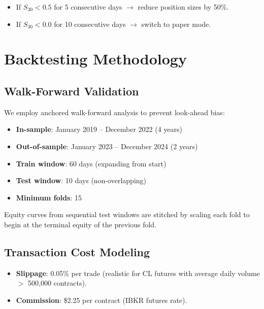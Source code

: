 \documentclass[12pt,a4paper]{article}
\begin{document}
\begin{itemize}[leftmargin=*]
    \item If $S_{30} < 0.5$ for 5 consecutive days $\rightarrow$ reduce position sizes by 50\%.
    \item If $S_{30} < 0.0$ for 10 consecutive days $\rightarrow$ switch to paper mode.
\end{itemize}

\section{Backtesting Methodology}
\label{sec:backtest}

\subsection{Walk-Forward Validation}

We employ anchored walk-forward analysis to prevent look-ahead bias:

\begin{itemize}[leftmargin=*]
    \item \textbf{In-sample}: January 2019 -- December 2022 (4 years)
    \item \textbf{Out-of-sample}: January 2023 -- December 2024 (2 years)
    \item \textbf{Train window}: 60 days (expanding from start)
    \item \textbf{Test window}: 10 days (non-overlapping)
    \item \textbf{Minimum folds}: 15
\end{itemize}

Equity curves from sequential test windows are stitched by scaling each fold to begin at the terminal equity of the previous fold.

\subsection{Transaction Cost Modeling}

\begin{itemize}[leftmargin=*]
    \item \textbf{Slippage}: 0.05\% per trade (realistic for CL futures with average daily volume $>$ 500{,}000 contracts).
    \item \textbf{Commission}: \$2.25 per contract (IBKR futures rate).
\end{itemize}
\end{document}
